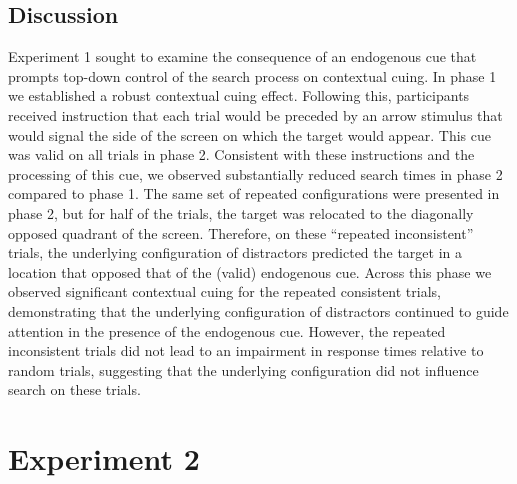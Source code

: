 \documentclass[
  man,floatsintext]{apa7}
\begin{document}
\hypertarget{discussion}{%
\subsection{Discussion}\label{discussion}}

Experiment 1 sought to examine the consequence of an endogenous cue that prompts top-down control of the search process on contextual cuing. In phase 1 we established a robust contextual cuing effect. Following this, participants received instruction that each trial would be preceded by an arrow stimulus that would signal the side of the screen on which the target would appear. This cue was valid on all trials in phase 2. Consistent with these instructions and the processing of this cue, we observed substantially reduced search times in phase 2 compared to phase 1. The same set of repeated configurations were presented in phase 2, but for half of the trials, the target was relocated to the diagonally opposed quadrant of the screen. Therefore, on these ``repeated inconsistent'' trials, the underlying configuration of distractors predicted the target in a location that opposed that of the (valid) endogenous cue. Across this phase we observed significant contextual cuing for the repeated consistent trials, demonstrating that the underlying configuration of distractors continued to guide attention in the presence of the endogenous cue. However, the repeated inconsistent trials did not lead to an impairment in response times relative to random trials, suggesting that the underlying configuration did not influence search on these trials.

\hypertarget{experiment-2}{%
\section{Experiment 2}\label{experiment-2}}
\end{document}
